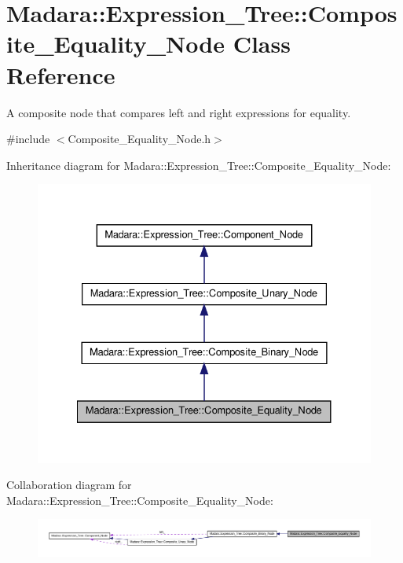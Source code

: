 \hypertarget{classMadara_1_1Expression__Tree_1_1Composite__Equality__Node}{
\section{Madara::Expression\_\-Tree::Composite\_\-Equality\_\-Node Class Reference}
\label{d6/df5/classMadara_1_1Expression__Tree_1_1Composite__Equality__Node}
}


A composite node that compares left and right expressions for equality.  




{\ttfamily \#include $<$Composite\_\-Equality\_\-Node.h$>$}



Inheritance diagram for Madara::Expression\_\-Tree::Composite\_\-Equality\_\-Node:
\nopagebreak
\begin{figure}[H]
\begin{center}
\leavevmode
\includegraphics[width=330pt]{d0/d21/classMadara_1_1Expression__Tree_1_1Composite__Equality__Node__inherit__graph}
\end{center}
\end{figure}


Collaboration diagram for Madara::Expression\_\-Tree::Composite\_\-Equality\_\-Node:
\nopagebreak
\begin{figure}[H]
\begin{center}
\leavevmode
\includegraphics[width=400pt]{de/d1e/classMadara_1_1Expression__Tree_1_1Composite__Equality__Node__coll__graph}
\end{center}
\end{figure}
